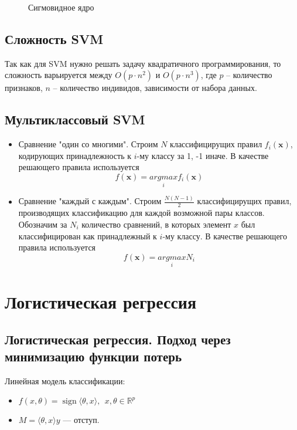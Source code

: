\documentclass{article}
\DeclareMathOperator{\sign}{sign}
\begin{document}
\begin{figure}[h!]
\end{figure}
\begin{figure}[h!]
\end{figure}
\begin{figure}[h!!]
\caption{Сигмовидное ядро}
\end{figure}

\subsection{Сложность SVM} 
Так как для SVM нужно решать задачу квадратичного программирования, то сложность варьируется между $O(p\cdot n^2)$ и $O(p\cdot n^3)$, где $p$ -- количество признаков, $n$ -- количество индивидов, зависимости от набора данных. 
\subsection{Мультиклассовый SVM} 

\begin{itemize}
    \item Сравнение "один со многими". 
 Строим $N$ классифицирущих правил $f_i(\boldsymbol{x})$, кодирующих принадлежность к $i$-му классу за 1, -1 иначе. В качестве решающего правила используется
    $$f(\boldsymbol{x}) = \underset{i}{argmax} f_i(\boldsymbol{x})$$ 

\item Сравнение "каждый с каждым". 
Строим $\frac{N(N-1)}{2}$ классифицирущих правил, производящих классификацию для каждой возможной пары классов. Обозначим за $N_i$ количество сравнений, в которых элемент $x$ был классифицирован как принадлежный к $i$-му классу. В качестве решающего правила используется
    $$f(\boldsymbol{x}) = \underset{i}{argmax} N_i$$ 

\end{itemize}

\section{Логистическая регрессия}
\subsection{Логистическая регрессия. Подход через минимизацию функции потерь}
Линейная модель классификации: 
\begin{itemize}
	\item $f(x, \theta)=\sign \langle \theta,x\rangle,~~ x,\theta\in \mathbb{R}^p$
	\item $M=\langle \theta,x \rangle y$ --- отступ.
\end{itemize}
\end{document}
